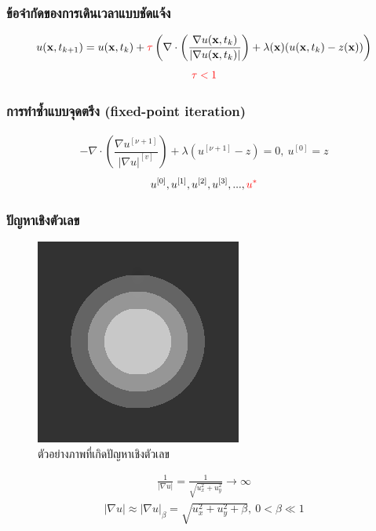 \documentclass[xcolor=dvipsnames, xetex,serif]{beamer}
\numberwithin{equation}{section}
\begin{document}
    \begin{frame}
        \frametitle{ข้อจำกัดของการเดินเวลาแบบชัดแจ้ง}
        \begin{align*}
        u(\mathbf{x},t_{k+1})=u(\mathbf{x},t_{k})+ \textcolor{red}{\tau}\left(\nabla \cdot\left(\dfrac{\nabla u (\mathbf{x},t_k)}{| \nabla u (\mathbf{x},t_k) | }\right) + \lambda(\mathbf{x})(u (\mathbf{x},t_k)-z(\mathbf{x})) \right)
        \end{align*}
        \vspace{1cm}
        \begin{align*}
            \textcolor{red}{\tau < 1}
        \end{align*}
    \end{frame} 
    \begin{frame}
        \frametitle{การทำซ้ำแบบจุดตรึง (fixed-point iteration)}
        \begin{align*}
            - \nabla\cdot\left(\dfrac{\nabla u^{[\nu+1]}}{{| \nabla u |}^{[v]} }\right) + \lambda(u^{[\nu+1]}-z)  = 0,\ u^{[0]}=z
        \end{align*}
        \vspace{1cm}
        \begin{align*}
        u^{[0]}, u^{[1]}, u^{[2]}, u^{[3]}, ..., \textcolor{red}{u^{*}}    
        \end{align*}
        \let\thefootnote\relax{}
    \end{frame} 
    \begin{frame}
        \frametitle{ปัญหาเชิงตัวเลข}
        \begin{figure}[H]
            \centering
            \includegraphics[width=0.2\linewidth]{images/grayscale_inpaint/result_splitbergman.png}
            \caption{ตัวอย่างภาพที่เกิดปัญหาเชิงตัวเลข}
            \label{image:rgb-space}
        \end{figure}
        \begin{align*}
            \tfrac{1}{| \nabla u |}=\tfrac{1}{\sqrt{u_x^2+u_y^2}} \rightarrow \infty
        \end{align*}
        \begin{align*}
            |\nabla u| \approx| \nabla u |_\beta=\sqrt{u_x^2+u_y^2+\beta},\ 0< \beta \ll 1
        \end{align*}
    \end{frame}
\end{document}
